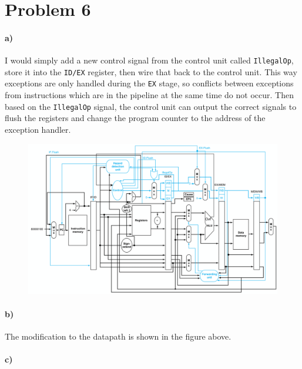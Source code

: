 \documentclass[12pt]{article}
\begin{document}
\section*{Problem 6}

\paragraph{a)}

I would simply add a new control signal from the control unit called \texttt{IllegalOp}, store it into the \texttt{ID/EX} register,
then wire that back to the control unit. This way exceptions are only handled during the \texttt{EX} stage, so conflicts between
exceptions from instructions which are in the pipeline at the same time do not occur. Then based on the \texttt{IllegalOp} signal,
the control unit can output the correct signals to flush the registers and change the program counter to the address of the exception
handler.

\pagebreak

\begin{figure}[!ht]
        \hspace*{-4cm}
        \begin{center}
                \includegraphics[width=5in]{problem6b.png}
        \end{center}
        \hspace*{-4cm}
\end{figure}

\paragraph{b)}

The modification to the datapath is shown in the figure above.

\paragraph{c)}
\end{document}
